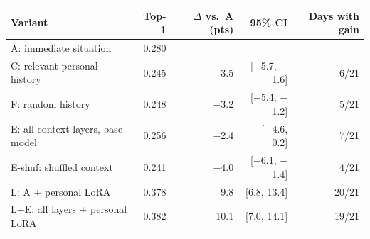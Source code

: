 \begin{tabular}{lrrrr}\toprule
Variant & Top-1 & $\Delta$ vs.\ A (pts) & 95\% CI & Days with gain\\\midrule
A: immediate situation & 0.280 & & & \\
C: relevant personal history & 0.245 & $-$3.5 & [$-$5.7, $-$1.6] & 6/21\\
F: random history & 0.248 & $-$3.2 & [$-$5.4, $-$1.2] & 5/21\\
E: all context layers, base model & 0.256 & $-$2.4 & [$-$4.6, 0.2] & 7/21\\
E-shuf: shuffled context & 0.241 & $-$4.0 & [$-$6.1, $-$1.4] & 4/21\\
L: A + personal LoRA & 0.378 & 9.8 & [6.8, 13.4] & 20/21\\
L+E: all layers + personal LoRA & 0.382 & 10.1 & [7.0, 14.1] & 19/21\\
\bottomrule
\end{tabular}
